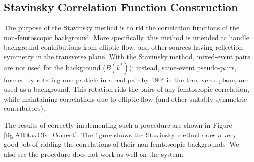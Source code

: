 \documentclass[../AnalysisNoteJBuxton.tex]{subfiles}
\begin{document}
\subsection{Stavinsky Correlation Function Construction}
\label{StavCfConstruction}

The purpose of the Stavinsky method is to rid the correlation functions of the non-femtoscopic background.  More specifically, this method is intended to handle background contributions from elliptic flow, and other sources having reflection symmetry in the transverse plane.  With the Stavinsky method, mixed-event pairs are not used for the background ($B(k^{*})$); instead, same-event pseudo-pairs, formed by rotating one particle in a real pair by 180$^\circ$ in the transverse plane, are used as a background.  This rotation rids the pairs of any femtoscopic correlation, while maintaining correlations due to elliptic flow (and other suitably symmetric contributors).

The results of correctly implementing such a procedure are shown in Figure \ref{fig:AllStavCfs_Correct}.  The figure shows the Stavinsky method does a very good job of ridding the \LamKpm correlations of their non-femtoscopic backgrounds.  We also see the procedure does not work as well on the \LamKs system.
\end{document}
